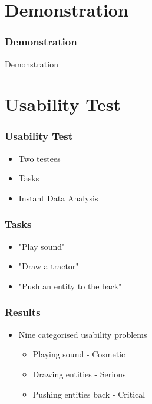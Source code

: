 	\section{Demonstration}
	
		\begin{frame}
			\frametitle{Demonstration}
			\begin{center}
				Demonstration
			\end{center}
		\end{frame}	
		
	\section{Usability Test}
		\begin{frame}
			\frametitle{Usability Test}
			\begin{itemize}
				\item Two testees
				\item Tasks
				\item Instant Data Analysis
			\end{itemize}
		\end{frame}
		
		\begin{frame}
			\frametitle{Tasks}
			\begin{itemize}
				\item "Play sound"
				\item "Draw a tractor"
				\item "Push an entity to the back"
			\end{itemize}
		\end{frame}
		
		\begin{frame}
			\frametitle{Results}
			\begin{itemize}
				\item Nine categorised usability problems
				\begin{itemize}
					\item Playing sound - Cosmetic
					\item Drawing entities - Serious
					\item Pushing entities back - Critical
				\end{itemize}
			\end{itemize}
		\end{frame}